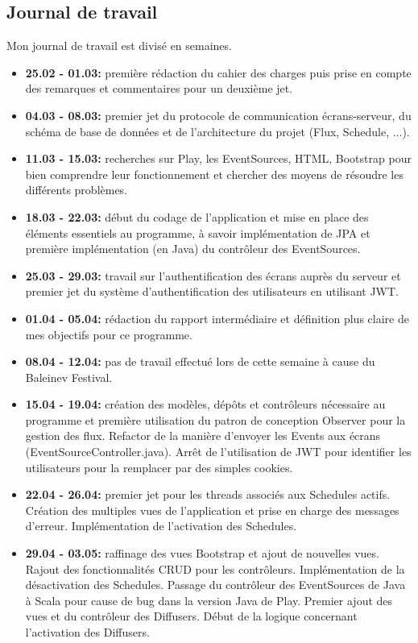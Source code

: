 \documentclass[french]{article}
\begin{document}
\begin{appendices}
\newpage
\section{Journal de travail}

Mon journal de travail est divisé en semaines.

\begin{itemize}
	\item \textbf{25.02 - 01.03:} première rédaction du cahier des charges puis prise en compte des remarques et commentaires pour un deuxième jet.
	\item \textbf{04.03 - 08.03:} premier jet du protocole de communication écrans-serveur, du schéma de base de données et de l'architecture du projet (Flux, Schedule, ...).
	\item \textbf{11.03 - 15.03:} recherches sur Play, les EventSources, HTML, Bootstrap pour bien comprendre leur fonctionnement et chercher des moyens de résoudre les différents problèmes.
	\item \textbf{18.03 - 22.03:} début du codage de l'application et mise en place des éléments essentiels au programme, à savoir implémentation de JPA et première implémentation (en Java) du contrôleur des EventSources.
	\item \textbf{25.03 - 29.03:} travail sur l'authentification des écrans auprès du serveur et premier jet du système d'authentification des utilisateurs en utilisant JWT.
	\item \textbf{01.04 - 05.04:} rédaction du rapport intermédiaire et définition plus claire de mes objectifs pour ce programme.
	\item \textbf{08.04 - 12.04:} pas de travail effectué lors de cette semaine à cause du Baleinev Festival.
	\item \textbf{15.04 - 19.04:} création des modèles, dépôts et contrôleurs nécessaire au programme et première utilisation du patron de conception Observer pour la gestion des flux. Refactor de la manière d'envoyer les Events aux écrans (EventSourceController.java). Arrêt de l'utilisation de JWT pour identifier les utilisateurs pour la remplacer par des simples cookies.
	\item \textbf{22.04 - 26.04:} premier jet pour les threads associés aux Schedules actifs. Création des multiples vues de l'application et prise en charge des messages d'erreur. Implémentation de l'activation des Schedules.
	\item \textbf{29.04 - 03.05:} raffinage des vues Bootstrap et ajout de nouvelles vues. Rajout des fonctionnalités CRUD pour les contrôleurs. Implémentation de la désactivation des Schedules. Passage du contrôleur des EventSources de Java à Scala pour cause de bug dans la version Java de Play. Premier ajout des vues et du contrôleur des Diffusers. Début de la logique concernant l'activation des Diffusers.

\end{itemize}
\end{appendices}
\end{document}
